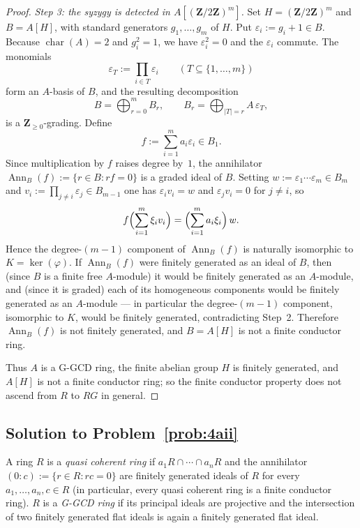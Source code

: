 \documentclass[11pt,reqno]{amsart}
\numberwithin{equation}{section}
\theoremstyle{definition}
\begin{document}
\begin{proof}
\smallskip
\noindent\emph{Step 3: the syzygy is detected in $A[(\mathbf Z/2\mathbf Z)^m]$.}
Set $H=(\mathbf Z/2\mathbf Z)^m$ and $B=A[H]$, with standard generators
$g_1,\dots,g_m$ of $H$. Put $\varepsilon_i:=g_i+1\in B$. Because
$\operatorname{char}(A)=2$ and $g_i^2=1$, we have $\varepsilon_i^2=0$
and the $\varepsilon_i$ commute. The monomials
\[
   \varepsilon_T:=\prod_{i\in T}\varepsilon_i \qquad (T\subseteq\{1,\dots,m\})
\]
form an $A$-basis of $B$, and the resulting decomposition
\[
   B=\bigoplus_{r=0}^m B_r,\qquad
   B_r=\bigoplus_{|T|=r} A\,\varepsilon_T,
\]
is a $\mathbf Z_{\ge0}$-grading. Define
\[
   f:=\sum_{i=1}^m a_i\varepsilon_i\in B_1.
\]
Since multiplication by $f$ raises degree by~$1$, the annihilator
$\operatorname{Ann}_B(f):=\{r\in B:rf=0\}$ is a graded ideal of $B$.
Setting
$w:=\varepsilon_1\cdots\varepsilon_m\in B_m$ and
$v_i:=\prod_{j\ne i}\varepsilon_j\in B_{m-1}$ one has $\varepsilon_i v_i=w$
and $\varepsilon_j v_i=0$ for $j\ne i$, so
\[
   f\Bigl(\sum_{i=1}^m \xi_i v_i\Bigr)=\Bigl(\sum_{i=1}^m a_i\xi_i\Bigr)\,w.
\]
Hence the degree-$(m-1)$ component of $\operatorname{Ann}_B(f)$ is
naturally isomorphic to $K=\ker(\varphi)$. If $\operatorname{Ann}_B(f)$
were finitely generated as an ideal of $B$, then (since $B$ is a
finite free $A$-module) it would be finitely generated as an
$A$-module, and (since it is graded) each of its homogeneous components
would be finitely generated as an $A$-module --- in particular the
degree-$(m-1)$ component, isomorphic to $K$, would be finitely
generated, contradicting Step~2. Therefore $\operatorname{Ann}_B(f)$ is
not finitely generated, and $B=A[H]$ is not a finite conductor ring.

\smallskip
Thus $A$ is a G-GCD ring, the finite abelian group $H$ is finitely
generated, and $A[H]$ is not a finite conductor ring; so the finite
conductor property does not ascend from $R$ to $RG$ in general.
\end{proof}

\subsection{Solution to Problem~\ref{prob:4aii}}\label{subsec:proof-4aii}

A ring $R$ is a \emph{quasi coherent ring} if $a_1R\cap\cdots\cap a_n R$
and the annihilator $(0:c):=\{r\in R:rc=0\}$ are finitely generated
ideals of $R$ for every $a_1,\dots,a_n,c\in R$ (in particular, every
quasi coherent ring is a finite conductor ring). $R$ is a
\emph{G-GCD ring} if its principal ideals are projective and the
intersection of two finitely generated flat ideals is again a finitely
generated flat ideal.
\end{document}
